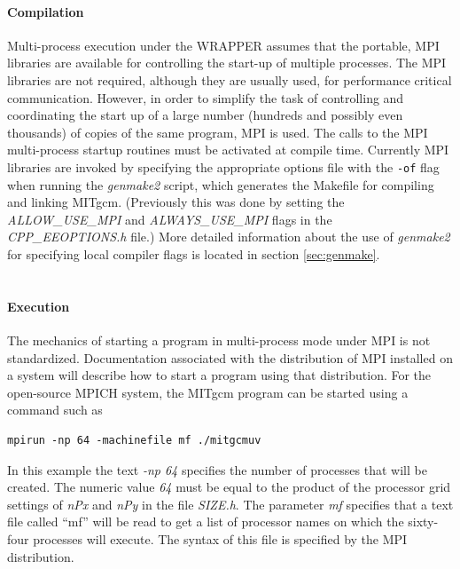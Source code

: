 \paragraph{Compilation} Multi-process execution under the WRAPPER
assumes that the portable, MPI libraries are available for controlling
the start-up of multiple processes. The MPI libraries are not
required, although they are usually used, for performance critical
communication. However, in order to simplify the task of controlling
and coordinating the start up of a large number (hundreds and possibly
even thousands) of copies of the same program, MPI is used. The calls
to the MPI multi-process startup routines must be activated at compile
time.  Currently MPI libraries are invoked by specifying the
appropriate options file with the {\tt-of} flag when running the {\em
  genmake2} script, which generates the Makefile for compiling and
linking MITgcm.  (Previously this was done by setting the {\em
  ALLOW\_USE\_MPI} and {\em ALWAYS\_USE\_MPI} flags in the {\em
  CPP\_EEOPTIONS.h} file.)  More detailed information about the use of
{\em genmake2} for specifying
local compiler flags is located in section \ref{sec:genmake}.\\


 \\
\paragraph{\bf Execution} The mechanics of starting a program in
multi-process mode under MPI is not standardized. Documentation
associated with the distribution of MPI installed on a system will
describe how to start a program using that distribution.  For the
open-source MPICH system, the MITgcm program can be started using a
command such as
\begin{verbatim}
mpirun -np 64 -machinefile mf ./mitgcmuv
\end{verbatim}
In this example the text {\em -np 64} specifies the number of
processes that will be created. The numeric value {\em 64} must be
equal to the product of the processor grid settings of {\em nPx} and
{\em nPy} in the file {\em SIZE.h}. The parameter {\em mf} specifies
that a text file called ``mf'' will be read to get a list of processor
names on which the sixty-four processes will execute. The syntax of
this file is specified by the MPI distribution.
\\

